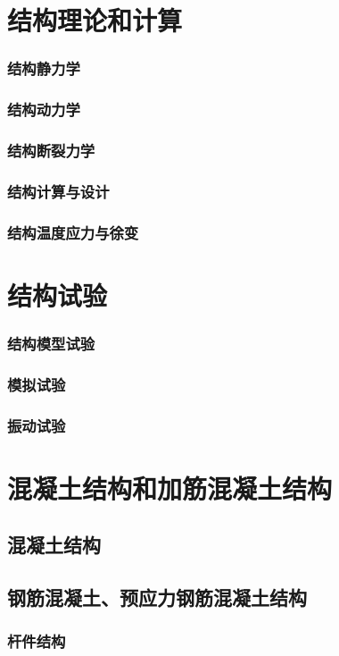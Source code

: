 \documentclass[UTF8]{../../ApplicationUniverse}
\begin{document}
\section{结构理论和计算}
    \subsubsection{结构静力学}
    \subsubsection{结构动力学}
    \subsubsection{结构断裂力学}
    \subsubsection{结构计算与设计}
    \subsubsection{结构温度应力与徐变}
\section{结构试验}
    \subsubsection{结构模型试验}
    \subsubsection{模拟试验}
    \subsubsection{振动试验}
\section{混凝土结构和加筋混凝土结构}
    \subsection{混凝土结构}
    \subsection{钢筋混凝土、预应力钢筋混凝土结构}
        \subsubsection{杆件结构}
\end{document}
